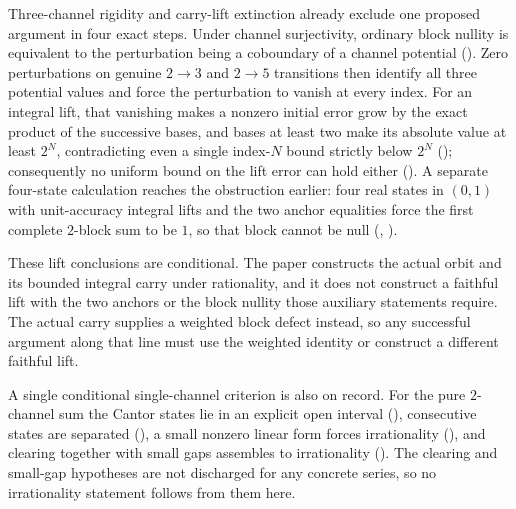 \documentclass[11pt]{article}
\begin{document}
Three-channel rigidity and carry-lift extinction already exclude one proposed
argument in four exact steps.  Under channel surjectivity, ordinary block
nullity is equivalent to the perturbation being a coboundary of a channel
potential
().  Zero perturbations on genuine $2\to3$ and $2\to5$ transitions
then identify all three potential values and force the perturbation to vanish
at every index.  For an integral lift, that vanishing makes a nonzero initial
error grow by the exact product of the successive bases, and bases at least two
make its absolute value at least $2^{N}$, contradicting even a single
index-$N$ bound strictly below $2^{N}$
(); consequently no uniform bound on the lift error can hold either
().  A separate four-state calculation reaches the obstruction
earlier: four real states in $(0,1)$ with unit-accuracy integral lifts and the
two anchor equalities force the first complete $2$-block sum to be $1$, so that
block cannot be null
(,
).

These lift conclusions are conditional.  The paper constructs the actual orbit
and its bounded integral carry under rationality, and it does not construct a
faithful lift with the two anchors or the block nullity those auxiliary
statements require.  The actual carry supplies a weighted block defect instead,
so any successful argument along that line must use the weighted identity or
construct a different faithful lift.

A single conditional single-channel criterion is also on record.  For the pure
$2$-channel sum the Cantor states lie in an explicit open interval
(),
consecutive states are separated
(), a small nonzero linear form forces irrationality
(),
and clearing together with small gaps assembles to irrationality
().
The clearing and small-gap hypotheses are not discharged for any concrete
series, so no irrationality statement follows from them here.
\end{document}
